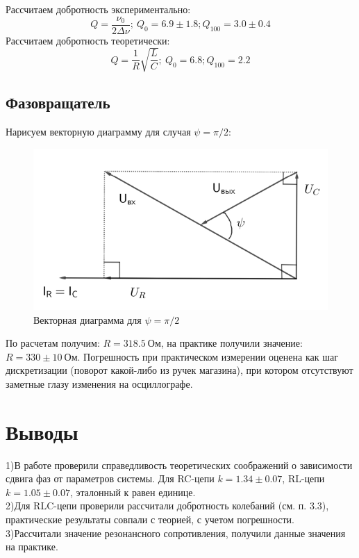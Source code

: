 \documentclass[a4paper, 12pt]{article}%
\begin{document}
	Рассчитаем добротность экспериментально:\\
	\begin{equation*}
		Q =\frac{\nu_0}{2\Delta \nu};		
		~Q_0 = 6.9 \pm 1.8; Q_{100} = 3.0 \pm 0.4
	\end{equation*}	
	Рассчитаем добротность теоретически:\\
	\begin{equation*}
		Q =\frac{1}{R}\sqrt{\frac{L}{C}};		
		~Q_0 = 6.8; Q_{100} = 2.2
	\end{equation*}	
	\subsection{Фазовращатель}
	Нарисуем векторную диаграмму для случая $\psi = \pi / 2$:
	\begin{figure}[H]
		\centering
		\includegraphics[width=0.8\linewidth]{phase}
		\caption{Векторная диаграмма для $\psi = \pi / 2$ }
		\label{fig:phase}
	\end{figure}
	По расчетам получим: $R = 318.5 ~Ом$, на практике получили значение:$R = 330\pm 10~ Ом$. Погрешность при практическом измерении оценена как шаг дискретизации (поворот какой-либо из ручек магазина), при котором отсутствуют заметные глазу изменения на осциллографе.
	\section{Выводы}
	1)В работе проверили справедливость теоретических соображений о зависимости сдвига фаз от параметров системы. Для RC-цепи $k = 1.34\pm 0.07$, RL-цепи $k = 1.05\pm 0.07$, эталонный к равен единице.\\
	2)Для RLC-цепи проверили рассчитали добротность колебаний (см. п. 3.3), практические результаты совпали с теорией, с учетом погрешности.\\
	3)Рассчитали значение резонансного сопротивления, получили данные значения на практике.
	
\end{document}
